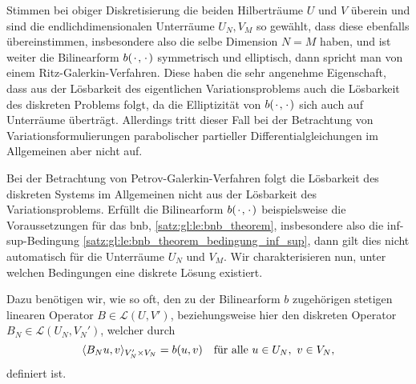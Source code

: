 Stimmen bei obiger Diskretisierung die beiden Hilberträume $U$ und $V$ überein und sind die endlichdimensionalen Unterräume $U_{N}, V_{M}$ so gewählt, dass diese ebenfalls übereinstimmen, insbesondere also die selbe Dimension $N = M$ haben, und ist weiter die Bilinearform $b(\blank, \blank)$ symmetrisch und elliptisch, dann spricht man von einem Ritz-Galerkin-Verfahren.
Diese haben die sehr angenehme Eigenschaft, dass aus der Lösbarkeit des eigentlichen Variationsproblems auch die Lösbarkeit des diskreten Problems folgt, da die Elliptizität von $b(\blank, \blank)$ sich auch auf Unterräume überträgt.
Allerdings tritt dieser Fall bei der Betrachtung von Variationsformulierungen parabolischer partieller Differentialgleichungen im Allgemeinen aber nicht auf.

Bei der Betrachtung von Petrov-Galerkin-Verfahren folgt die Lösbarkeit des diskreten Systems im Allgemeinen nicht aus der Lösbarkeit des Variationsproblems.
Erfüllt die Bilinearform $b(\blank, \blank)$ beispielsweise die Voraussetzungen für das \acl{bnb}, \cref{satz:gl:le:bnb_theorem}, insbesondere also die inf-sup-Bedingung \cref{satz:gl:le:bnb_theorem_bedingung_inf_sup}, dann gilt dies nicht automatisch für die Unterräume $U_{N}$ und $V_{M}$.
Wir charakterisieren nun, unter welchen Bedingungen eine diskrete Lösung existiert.


Dazu benötigen wir, wie so oft, den zu der Bilinearform $b$ zugehörigen stetigen linearen Operator $B \in \mathcal L(U, V')$, beziehungsweise hier den diskreten Operator $B_{N} \in \mathcal L(U_{N}, V_{N}')$, welcher durch
\begin{equation}
    \skp{B_{N} u}{v}{V_{N}' \times V_{N}} = b(u, v) \quad \fa u \in U_{N}, ~v \in V_{N},
\end{equation}
definiert ist.

